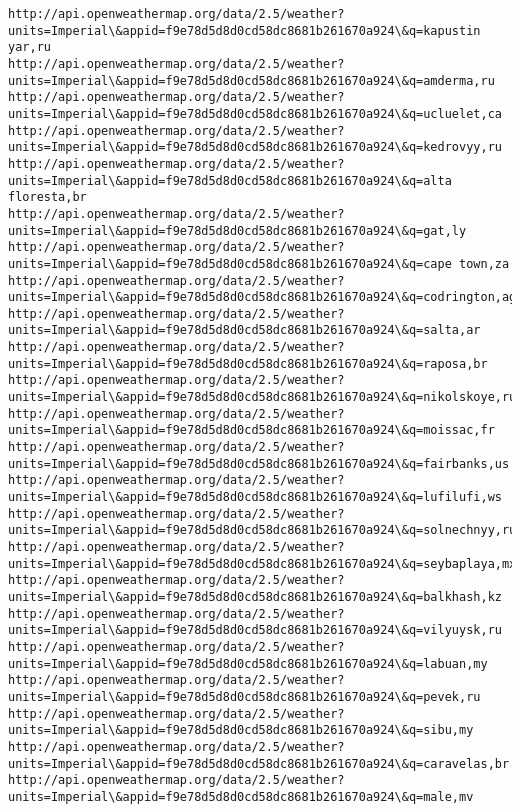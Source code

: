 \documentclass[11pt]{article}
\begin{document}
\begin{Verbatim}[commandchars=\\\{\}]
http://api.openweathermap.org/data/2.5/weather?units=Imperial\&appid=f9e78d5d8d0cd58dc8681b261670a924\&q=kapustin yar,ru
http://api.openweathermap.org/data/2.5/weather?units=Imperial\&appid=f9e78d5d8d0cd58dc8681b261670a924\&q=amderma,ru
http://api.openweathermap.org/data/2.5/weather?units=Imperial\&appid=f9e78d5d8d0cd58dc8681b261670a924\&q=ucluelet,ca
http://api.openweathermap.org/data/2.5/weather?units=Imperial\&appid=f9e78d5d8d0cd58dc8681b261670a924\&q=kedrovyy,ru
http://api.openweathermap.org/data/2.5/weather?units=Imperial\&appid=f9e78d5d8d0cd58dc8681b261670a924\&q=alta floresta,br
http://api.openweathermap.org/data/2.5/weather?units=Imperial\&appid=f9e78d5d8d0cd58dc8681b261670a924\&q=gat,ly
http://api.openweathermap.org/data/2.5/weather?units=Imperial\&appid=f9e78d5d8d0cd58dc8681b261670a924\&q=cape town,za
http://api.openweathermap.org/data/2.5/weather?units=Imperial\&appid=f9e78d5d8d0cd58dc8681b261670a924\&q=codrington,ag
http://api.openweathermap.org/data/2.5/weather?units=Imperial\&appid=f9e78d5d8d0cd58dc8681b261670a924\&q=salta,ar
http://api.openweathermap.org/data/2.5/weather?units=Imperial\&appid=f9e78d5d8d0cd58dc8681b261670a924\&q=raposa,br
http://api.openweathermap.org/data/2.5/weather?units=Imperial\&appid=f9e78d5d8d0cd58dc8681b261670a924\&q=nikolskoye,ru
http://api.openweathermap.org/data/2.5/weather?units=Imperial\&appid=f9e78d5d8d0cd58dc8681b261670a924\&q=moissac,fr
http://api.openweathermap.org/data/2.5/weather?units=Imperial\&appid=f9e78d5d8d0cd58dc8681b261670a924\&q=fairbanks,us
http://api.openweathermap.org/data/2.5/weather?units=Imperial\&appid=f9e78d5d8d0cd58dc8681b261670a924\&q=lufilufi,ws
http://api.openweathermap.org/data/2.5/weather?units=Imperial\&appid=f9e78d5d8d0cd58dc8681b261670a924\&q=solnechnyy,ru
http://api.openweathermap.org/data/2.5/weather?units=Imperial\&appid=f9e78d5d8d0cd58dc8681b261670a924\&q=seybaplaya,mx
http://api.openweathermap.org/data/2.5/weather?units=Imperial\&appid=f9e78d5d8d0cd58dc8681b261670a924\&q=balkhash,kz
http://api.openweathermap.org/data/2.5/weather?units=Imperial\&appid=f9e78d5d8d0cd58dc8681b261670a924\&q=vilyuysk,ru
http://api.openweathermap.org/data/2.5/weather?units=Imperial\&appid=f9e78d5d8d0cd58dc8681b261670a924\&q=labuan,my
http://api.openweathermap.org/data/2.5/weather?units=Imperial\&appid=f9e78d5d8d0cd58dc8681b261670a924\&q=pevek,ru
http://api.openweathermap.org/data/2.5/weather?units=Imperial\&appid=f9e78d5d8d0cd58dc8681b261670a924\&q=sibu,my
http://api.openweathermap.org/data/2.5/weather?units=Imperial\&appid=f9e78d5d8d0cd58dc8681b261670a924\&q=caravelas,br
http://api.openweathermap.org/data/2.5/weather?units=Imperial\&appid=f9e78d5d8d0cd58dc8681b261670a924\&q=male,mv

\end{Verbatim}
\end{document}
